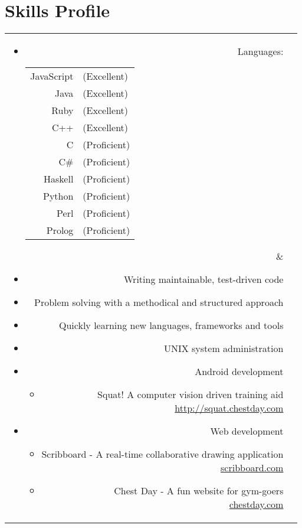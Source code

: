 \section*{Skills Profile}

\begin{tabular}{rl}

\parbox[t]{0.3\textwidth}{
	\begin{itemize}
		\item Languages:
		\begin{tabular}[h]{rl}
			JavaScript & (Excellent)\\
			Java & (Excellent)\\
			Ruby & (Excellent)\\
			C++ & (Excellent)\\
			C & (Proficient)\\
			C\# & (Proficient)\\
			Haskell & (Proficient)\\
			Python & (Proficient)\\
			Perl & (Proficient)\\
			Prolog & (Proficient)
		\end{tabular}
	\end{itemize}}
&
\parbox[t]{0.6\textwidth}{
	\begin{itemize}
		\item Writing maintainable, test-driven code
		\item Problem solving with a methodical and structured approach
		\item Quickly learning new languages, frameworks and tools
		\item UNIX system administration
		\item Android development
			\begin{itemize}
				\item Squat! A computer vision driven training aid\\
				\url{http://squat.chestday.com}
			\end{itemize}
		\item Web development
			\begin{itemize}
				\item Scribboard - A real-time collaborative drawing application\\
				\url{scribboard.com}
				\item Chest Day - A fun website for gym-goers\\
				\url{chestday.com}
			\end{itemize}
	\end{itemize}}\\

\end{tabular}